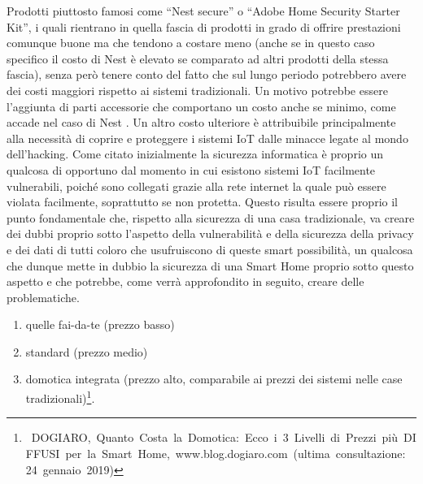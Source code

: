 Prodotti piuttosto famosi come “Nest secure” o “Adobe Home Security Starter Kit”, i quali rientrano in quella fascia di prodotti in grado di offrire prestazioni comunque buone ma che tendono a costare meno (anche se in questo caso specifico il costo di Nest è elevato se comparato ad altri prodotti della stessa fascia), senza però tenere conto del fatto che sul lungo periodo potrebbero avere dei costi maggiori rispetto ai sistemi tradizionali. Un motivo potrebbe essere l’aggiunta di parti accessorie che comportano un costo anche se minimo, come accade nel caso di Nest . Un altro costo ulteriore è attribuibile principalmente alla necessità di coprire e proteggere i sistemi IoT dalle minacce legate al mondo dell’hacking. Come citato inizialmente la sicurezza informatica è proprio un qualcosa di opportuno dal momento in cui esistono sistemi IoT facilmente vulnerabili, poiché sono collegati grazie alla rete internet la quale può essere violata facilmente, soprattutto se non protetta. 
Questo risulta essere proprio il punto fondamentale che, rispetto alla sicurezza di una casa tradizionale, va creare dei dubbi proprio sotto l’aspetto della vulnerabilità e della sicurezza della privacy e dei dati di tutti coloro che usufruiscono di queste smart possibilità, un qualcosa che dunque mette in dubbio la sicurezza di una Smart Home proprio sotto questo aspetto e che potrebbe, come verrà approfondito in seguito, creare delle problematiche.
\begin{enumerate}
\item  quelle fai-da-te (prezzo basso)

\item  standard (prezzo medio)

\item  domotica integrata (prezzo alto, comparabile ai prezzi dei sistemi nelle case tradizionali)\footnote{\ DOGIARO,\ Quanto\ Costa\ la\ Domotica:\ Ecco\ i\ 3\ Livelli\ di\ Prezzi\ pi\textrm{\`{u}}\ DIFFUSI\ per\ la\ Smart\ Home,\ www.blog.dogiaro.com\ (ultima\ consultazione:\ 24\ gennaio\ 2019)}. 
\end{enumerate}